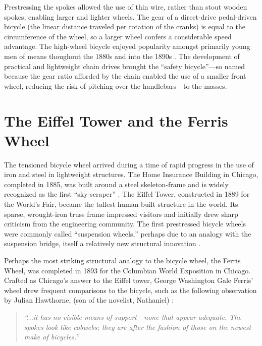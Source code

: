 \documentclass[../thesis.tex]{subfiles}
\begin{document}
Prestressing the spokes allowed the use of thin wire, rather than stout wooden spokes, enabling larger and lighter wheels. The gear of a direct-drive pedal-driven bicycle (the linear distance traveled per rotation of the cranks) is equal to the circumference of the wheel, so a larger wheel confers a considerable speed advantage. The high-wheel bicycle enjoyed popularity amongst primarily young men of means thoughout the 1880s and into the 1890s \cite{Smith1972}. The development of practical and lightweight chain drives brought the ``safety bicycle''---so named because the gear ratio afforded by the chain enabled the use of a smaller front wheel, reducing the risk of pitching over the handlebars---to the masses.

\section{The Eiffel Tower and the Ferris Wheel}

The tensioned bicycle wheel arrived during a time of rapid progress in the use of iron and steel in lightweight structures. The Home Insurance Building in Chicago, completed in 1885, was built around a steel skeleton-frame and is widely recognized as the first ``sky-scraper'' . The Eiffel Tower, constructed in 1889 for the World's Fair, became the tallest human-built structure in the world. Its sparse, wrought-iron truss frame impressed visitors and initially drew sharp criticism from the engineering community. The first prestressed bicycle wheels were commonly called ``suspension wheels,'' perhaps due to an analogy with the suspension bridge, itself a relatively new structural innovation \cite{Sewall1896}.

Perhaps the most striking structural analogy to the bicycle wheel, the Ferris Wheel, was completed in 1893 for the Columbian World Exposition in Chicago. Crafted as Chicago's answer to the Eiffel tower, George Washington Gale Ferris' wheel drew frequent comparisons to the bicycle, such as the following observation by Julian Hawthorne, (son of the novelist, Nathaniel) \cite{Larson2004}:

\begin{quote}
\emph{``...it has no visible means of support---none that appear adequate. The spokes look like cobwebs; they are after the fashion of those on the newest make of bicycles.''}
\end{quote}
\end{document}
